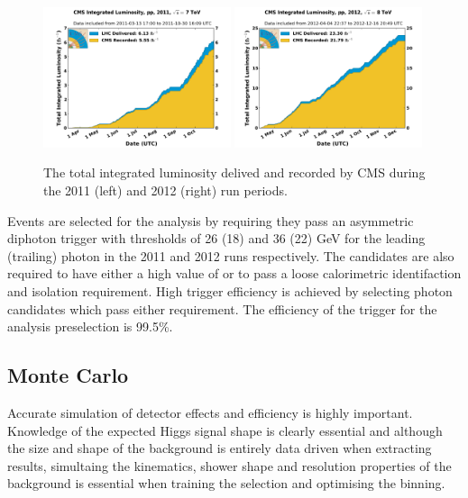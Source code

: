 \begin{figure}
  \includegraphics[width=0.49\textwidth]{analysis_comps/plots/int_lumi_2011.pdf}
  \includegraphics[width=0.49\textwidth]{analysis_comps/plots/int_lumi_2012.pdf}
  \caption{The total integrated luminosity delived and recorded by CMS during the 2011 (left) and 2012 (right) run periods.}
  \label{fig:intlumi}
\end{figure}

Events are selected for the analysis by requiring they pass an asymmetric diphoton trigger with \ET thresholds of 26 (18) and 36 (22) GeV for the leading (trailing) photon in the 2011 and 2012 runs respectively. The candidates are also required to have either a high value of \rnine or to pass a loose calorimetric identifaction and isolation requirement. High trigger efficiency is achieved by selecting photon candidates which pass either requirement. The efficiency of the trigger for the analysis preselection is 99.5\%.

\subsection{Monte Carlo}
\label{sec:mc}

Accurate simulation of detector effects and efficiency is highly important. Knowledge of the expected Higgs signal shape is clearly essential and although the size and shape of the \mgg background is entirely data driven when extracting results, simultaing the kinematics, shower shape and resolution properties of the background is essential when training the selection and optimising the binning. 

